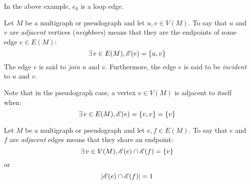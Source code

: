 \documentclass[letterpaper,12pt,fleqn]{article}
\newcommand{\E}{\mathscr{E}}
\begin{document}
In the above example, \(e_6\) is a loop edge.

\begin{definition}
  Let \(M\) be a multigraph or pseudograph and let \(u,v\in V(M)\).  To say that \(u\) and \(v\) are
  \emph{adjacent} vertices (\emph{neighbors}) means that they are the endpoints of some edge \(e\in E(M)\):
  \[\exists\,e\in E(M),\E(e)=\set{u,v}\]
  The edge \(e\) is said to \emph{join} \(u\) and \(v\).  Furthermore, the edge \(e\) is said to be \emph{incident}
  to \(u\) and \(v\).
\end{definition}

Note that in the pseudograph case, a vertex \(v\in V(M)\) is adjacent to itself when:
\[\exists\,e\in E(M),\E(e)=\set{v,v}=\set{v}\]

\begin{definition}
  Let \(M\) be a multigraph or pseudograph and let \(e,f\in E(M)\).  To say that \(e\) and \(f\) are
  \emph{adjacent} edges means that they share an endpoint:
  \[\exists\,v\in V(M),\E(e)\cap\E(f)=\set{v}\]
  or
  \[\abs{\E(e)\cap\E(f)}=1\]
\end{definition}
\end{document}
